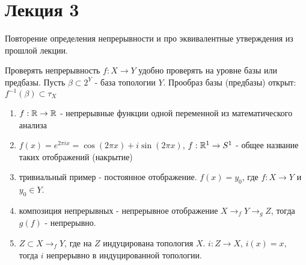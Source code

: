 \section{Лекция 3}


Повторение определения непрерывности и про эквивалентные утверждения из прошлой лекции.



\begin{nota_bene}[филосовское]
    Проверять непрерывность $f: X \rightarrow Y$ удобно проверять на уровне базы или предбазы.
    Пусть $\beta \subset 2^Y$ - база топологии $Y$.
    Прообраз базы (предбазы) открыт: $f^{-1}(\beta) \subset \tau_X$
\end{nota_bene}

\begin{example}
    \begin{enumerate}
        \item $f: \mathbb{R} \rightarrow \mathbb{R}$ - непрерывные функции одной переменной из математического анализа
        \item $f(x) = e^{2 \pi i x} = \cos (2\pi x) + i \sin (2\pi x)$, $f: \mathbb{R}^1 \rightarrow S^1$ - общее название таких отображений (накрытие)
        \item тривиальный пример - постоянное отображение. $f(x) = y_0$, где $f: X \rightarrow Y$ и $y_0 \in Y$.
        \item композиция непрерывных - непрерывное отображение $X \rightarrow_{f} Y \rightarrow_{g} Z$, тогда $g(f)$ - непрерывно.
        \item $Z \subset X \rightarrow_f Y$, где на $Z$ индуцирована топология $X$. $i: Z \rightarrow X$, $i(x) = x$, тогда $i$ непрерывно в индуцированной топологии.
    \end{enumerate}
\end{example}

